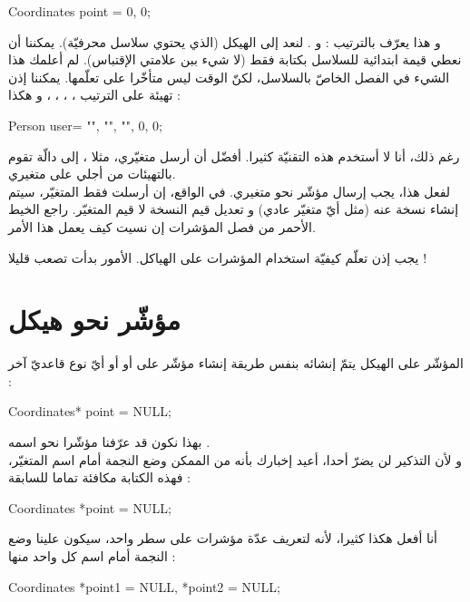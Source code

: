 \begin{Csource}
Coordinates point = {0, 0};
\end{Csource}

و هذا يعرّف بالترتيب :
و
.
لنعد إلى الهيكل
(الذي يحتوي سلاسل محرفيّة). يمكننا أن نعطي قيمة ابتدائية للسلاسل بكتابة فقط
(لا شيء ببن علامتي الإقتباس). لم أعلمك هذا الشيء في الفصل الخاصّ بالسلاسل، لكنّ الوقت ليس متأخّرا على تعلّمها.
يمكننا إذن تهيئة على الترتيب
،
،
،
،
و
هكذا :

\begin{Csource}
Person user= {"", "", "", 0, 0};
\end{Csource}

رغم ذلك، أنا لا أستخدم هذه التقنيّة كثيرا. أفضّل أن أرسل متغيّري، مثلا
،
إلى دالّة
تقوم بالتهيئات من أجلي على متغيري.\\
لفعل هذا، يجب إرسال مؤشّر نحو متغيري. في الواقع، إن أرسلت فقط المتغيّر، سيتم إنشاء نسخة عنه (مثل أيّ متغيّر عادي) و تعديل قيم النسخة لا قيم المتغيّر. راجع الخيط الأحمر من فصل المؤشرات إن نسيت كيف يعمل هذا الأمر.

يجب إذن تعلّم كيفيّة استخدام المؤشرات على الهياكل. الأمور بدأت تصعب قليلا !

\section{مؤشّر نحو هيكل}

المؤشّر على الهيكل يتمّ إنشائه بنفس طريقة إنشاء مؤشّر على
أو
أو أيّ نوع قاعديّ آخر :

\begin{Csource}
Coordinates* point = NULL;
\end{Csource}
بهذا نكون قد عرّفنا مؤشّرا نحو
اسمه
.\\
و لأن التذكير لن يضرّ أحدا، أعيد إخبارك بأنه من الممكن وضع النجمة أمام اسم المتغيّر، فهذه الكتابة مكافئة تماما للسابقة :

\begin{Csource}
Coordinates *point = NULL;
\end{Csource}

أنا أفعل هكذا كثيرا، لأنه لتعريف عدّة مؤشرات على سطر واحد، سيكون علينا وضع النجمة أمام اسم كل واحد منها :

\begin{Csource}
Coordinates *point1 = NULL, *point2 = NULL;
\end{Csource}

